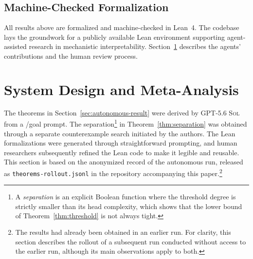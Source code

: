 \documentclass{article}
\theoremstyle{definition}
\theoremstyle{plain}
\newcommand{\gpt}{\textsc{GPT-5.6 Sol}\xspace}
\begin{document}
\subsection{Machine-Checked Formalization}

All results above are formalized and machine-checked in Lean~4. The codebase lays the groundwork for a publicly available Lean environment supporting agent-assisted research in mechanistic interpretability. Section~\ref{sec:system} describes the agents' contributions and the human review process.

\clearpage
\section{System Design and Meta-Analysis}
\label{sec:system}



The theorems in Section~\ref{sec:autonomous-result} were derived by \gpt{} from a /goal prompt. The separation\footnote{A \emph{separation} is an explicit Boolean function where the threshold degree is strictly smaller than its head complexity, which shows that the lower bound of Theorem~\ref{thm:threshold} is not always tight.} in Theorem~\ref{thm:separation} was obtained through a separate counterexample search initiated by the authors. The Lean formalizations were generated through straightforward prompting, and human researchers subsequently refined the Lean code to make it legible and reusable. This section is based on the anonymized record of the autonomous run, released as \texttt{theorems-rollout.jsonl} in the repository accompanying this paper.\footnote{The results had already been obtained in an earlier run. For clarity, this section describes the rollout of a subsequent run conducted without access to the earlier run, although its main observations apply to both.}
\end{document}
